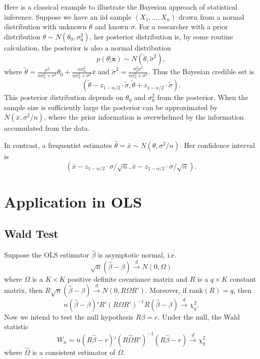 \documentclass[11pt]{article}
\renewcommand{\hat}{\widehat}
\begin{document}
Here is a classical example to illustrate the Bayesian approach of statistical inference.
Suppose we have an iid sample $(X_1,\ldots,X_n)$ drawn from a normal distribution with 
unknown $\theta$ and known $\sigma$. For a researcher with a prior distribution 
$\theta \sim N(\theta_0, \sigma_0^2)$, her posterior distribution is,
by some routine calculation, the posterior is also a normal distribution
\[
p(\theta | \mathbf{x}) \sim N\left( \tilde{\theta}, \tilde{\sigma}^2   \right),
\]
where $ \tilde{\theta} = \frac{\sigma^2}{n \sigma_0^2 + \sigma^2} \theta_0 
+ \frac{n\sigma_0^2}{n\sigma_0^2 + \sigma^2} \bar{x} $ 
and $\tilde{\sigma}^2 = \frac{\sigma_0^2 \sigma^2}{n\sigma_0^2 + \sigma^2}$.
Thus the Bayesian credible set is 
\[
\left( \tilde{\theta} - z_{1-\alpha/2 } \cdot \tilde{\sigma},  \tilde{\theta} + z_{1-\alpha/2 }\cdot  \tilde{\sigma}  \right).
\]
This posterior distribution depends on $\theta_0$ and $\sigma_0^2$ from the posterior. 
When the sample size is sufficiently large 
the posterior can be approximated by $N( \bar{x}, \sigma^2 / n )$,
where the prior information is overwhelmed by the information accumulated from the data.

In contrast, a frequentist estimates $\hat{\theta} = \bar{x} \sim N(\theta, \sigma^2 / n) $. Her 
confidence interval is 
$$
\left( \bar{x} - z_{1-\alpha/2 } \cdot \sigma/\sqrt{n},  
\bar{x} - z_{1-\alpha/2 } \cdot \sigma/\sqrt{n} \right).
$$



\section{Application in OLS}\label{application-in-ols}

\subsection{Wald Test}\label{wald-test}

Suppose the OLS estimator \(\widehat{\beta}\) is asymptotic normal, i.e.
\[\sqrt{n}\left(\widehat{\beta}-\beta\right)\stackrel{d}{\to}N\left(0,\Omega\right)\]
where \(\Omega\) is a \(K\times K\) positive definite covariance matrix
and \(R\) is a \(q\times K\) constant matrix, then
\(R\sqrt{n}\left(\widehat{\beta}-\beta\right)\stackrel{d}{\to}N\left(0,R\Omega R'\right)\).
Moreover, if \(\mbox{rank}\left(R\right)=q\), then
\[n\left(\widehat{\beta}-\beta\right)'R'\left(R\Omega R'\right)^{-1}R\left(\widehat{\beta}-\beta\right)\stackrel{d}{\to}\chi_{q}^{2}.\]
Now we intend to test the null hypothesis \(R\beta=r\). Under the null,
the Wald statistic
\[W_{n}=n\left(R\widehat{\beta}-r\right)'\left(R\widehat{\Omega}R'\right)^{-1}\left(R\widehat{\beta}-r\right)\stackrel{d}{\to}\chi_{q}^{2}\]
where \(\widehat{\Omega}\) is a consistent estimator of \(\Omega\).
\end{document}
